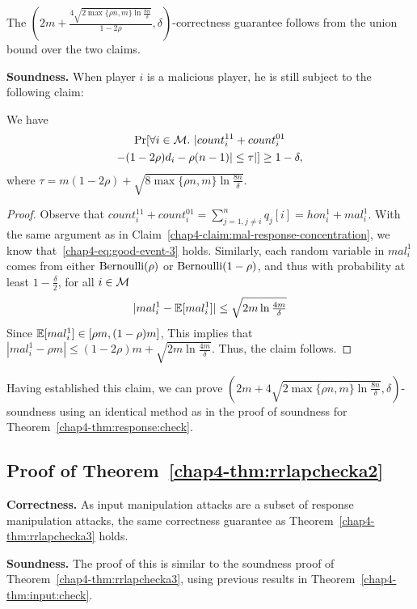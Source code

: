 The $(2m+\frac{4\sqrt{2 \max\{\rho n, m\} \ln \frac{8n}{\delta}}}{1-2\rho}, \delta)$-correctness guarantee follows from the union bound over the two claims.

\textbf{Soundness.}
When player $i$ is a malicious player, he is still subject to the following claim:

\begin{claim}\label{chap4-claim:mal-input-concentration}
We have
\begin{multline*}
    \Pr[\forall i \in \mathcal{M}.~|count_i^{11} + count_i^{01} \\ -(1-2\rho)d_i - \rho(n-1)| \leq \tau|] \geq 1-\delta,
\end{multline*}
where $\tau = m(1-2\rho) + \sqrt{8 \max\{\rho n, m\} \ln \frac{8n}{\delta}}$.
\end{claim}
\begin{proof}
Observe that $count_i^{11} + count_i^{01} = \sum_{j=1,j\neq i}^n q_{j}[i] = hon_i^1 + mal_i^1$. With the same argument as in Claim~\ref{chap4-claim:mal-response-concentration}, we know that~\eqref{chap4-eq:good-event-3} holds. Similarly, each random variable in $mal_i^1$ comes from either $\textnormal{Bernoulli}(\rho)$ or $\textnormal{Bernoulli}(1-\rho)$, and thus with probability at least $1-\frac{\delta}{2}$, for all $i \in \mathcal{M}$
\[
    |mal_i^1 - \operatorname{\mathbb{E}}[mal_i^1]| \leq \sqrt{2m \ln \tfrac{4m}{\delta}}
\]
Since $\operatorname{\mathbb{E}}[mal_i^1] \in [\rho m, (1-\rho) m]$, 
This implies that $|mal_i^1 - \rho m | \leq  (1-2\rho)m + \sqrt{2m \ln \frac{4m}{\delta}}$. Thus, the claim follows.
\end{proof}

Having established this claim, we can prove $(2m + 4\sqrt{2 \max\{\rho n, m\} \ln \frac{8n}{\delta}}, \delta)$-soundness using an identical method as in the proof of soundness for Theorem~\ref{chap4-thm:response:check}.

\subsection{Proof of Theorem~\ref{chap4-thm:rrlapchecka2}}\label{chap4-app:thm:rrlapchecka2}
\textbf{Correctness.} As input manipulation attacks are a subset of response manipulation attacks, the same correctness guarantee as Theorem~\ref{chap4-thm:rrlapchecka3} holds.

\textbf{Soundness.}
The proof of this is similar to the soundness proof of Theorem~\ref{chap4-thm:rrlapchecka3}, using previous results in Theorem~\ref{chap4-thm:input:check}.



